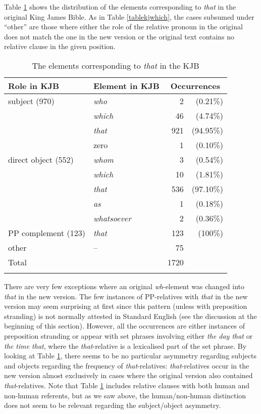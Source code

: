 Table \ref{tablekjthat} shows the distribution of the elements corresponding to \textit{that} in the original King James Bible. As in Table \ref{tablekjwhich}, the cases subsumed under ``other'' are those where either the role of the relative pronoun in the original does not match the one in the new version or the original text contains no relative clause in the given position.

\begin{table}[p]
\begin{tabular}{ll r@{~}r}
\lsptoprule
{Role in KJB} & {Element in KJB} &\multicolumn{2}{c}{Occurrences}\\\midrule
{subject (970)} & \textit{who}   & {2}   & (0.21\%)\\
                    {} & \textit{which} & {46}  & (4.74\%)\\
                    {} & \textit{that}  & {921} & (94.95\%)\\
                    {} & zero           & {1}   & (0.10\%)\\
\addlinespace
{direct object (552)} & \textit{whom} & {3} & (0.54\%)\\
{} & \textit{which} & {10} & (1.81\%)\\
{} & \textit{that} & {536} & (97.10\%)\\
{} & \textit{as} & {1} & (0.18\%)\\
{} & \textit{whatsoever} & {2} & (0.36\%)\\
\addlinespace
{PP complement (123)} & \textit{that} & {123} & (100\%)\\
\addlinespace
other & -- & 75\\
\midrule
Total & & 1720 &\\
\lspbottomrule
\end{tabular}
\caption{The elements corresponding to \textit{that} in the KJB}
\label{tablekjthat}
\end{table}

There are very few exceptions where an original \textit{wh}-element was changed into \textit{that} in the new version. The few instances of PP-relatives with \textit{that} in the new version may seem surprising at first since this pattern (unless with preposition stranding) is not normally attested in Standard English (see the discussion at the beginning of this section). However, all the occurrences are either instances of preposition stranding or appear with set phrases involving either \textit{the day that} or \textit{the time that}, where the \textit{that}-relative is a lexicalised part of the set phrase. By looking at Table \ref{tablekjthat}, there seems to be no particular asymmetry regarding subjects and objects regarding the frequency of \textit{that}-relatives: \textit{that}-relatives occur in the new version almost exclusively in cases where the original version also contained \textit{that}-relatives. Note that Table \ref{tablekjthat} includes relative clauses with both human and non-human referents, but as we saw above, the human/non-human distinction does not seem to be relevant regarding the subject/object asymmetry.

